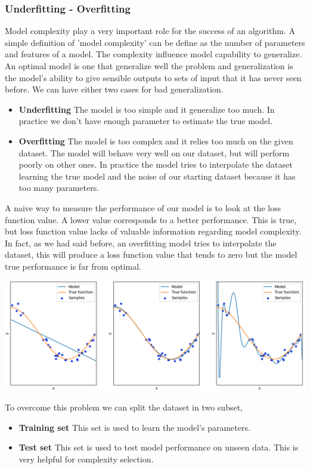 \documentclass[main.tex]{subfiles}
\begin{document}
\subsubsection{Underfitting - Overfitting} \label{fitting}
Model complexity play a very important role for the success of an algorithm. A simple definition of 'model complexity' can be define as the number of parameters and features of a model. The complexity influence model capability to generalize.
An optimal model is one that generalize well the problem and generalization is the model’s ability to give sensible outputs to sets of input that it has never seen before. We can have either two cases for bad generalization.
\begin{itemize}
    \item \textbf{Underfitting} The model is too simple and it generalize too much. In practice we don't have enough parameter to estimate the true model.
    \item \textbf{Overfitting} The model is too complex and it relies too much on the given dataset. The model will behave very well on our dataset, but will perform poorly on other ones. In practice the model tries to interpolate the dataset learning the true model and the noise of our starting dataset because it has too many parameters.
\end{itemize}
A naive way to measure the performance of our model is to look at the loss function value. A lower value corresponds to a better performance. This is true, but loss function value lacks of valuable information regarding model complexity. In fact, as we had said before, an overfitting model tries to interpolate the dataset, this will produce a loss function value that tends to zero but the model true performance is far from optimal.
\begin{center}
    \includegraphics[scale=0.5]{img/Under-Overfitting.png}
\end{center}
To overcome this problem we can split the dataset in two subset,
\begin{itemize}
    \item \textbf{Training set} This set is used to learn the model's parameters.
    \item \textbf{Test set} This set is used to test model performance on unseen data. This is very helpful for complexity selection.
\end{itemize}
\end{document}
